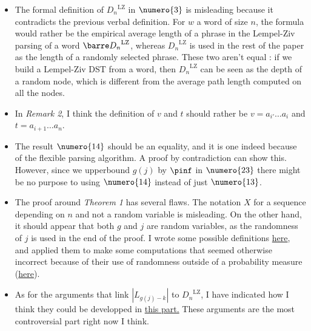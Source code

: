 
\begin{itemize}

\item The formal definition of ${D_n}^{\text{LZ}}$ in $\numero{3}$ is 
      misleading because it contradicts the previous verbal definition.
      For $w$ a word of size $n$, the formula
      would rather be the empirical average length of a phrase in the Lempel-Ziv
      parsing of a word ${\barre D_n}^{\text{LZ}}$, whereas
      ${D_n}^{\text{LZ}}$ is used in the rest of the paper as the length
      of a randomly selected phrase. These two aren't equal :
      if we build a Lempel-Ziv DST from a word, then 
      ${D_n}^{\text{LZ}}$ can be seen as the depth of a random node, 
      which is different from the average path length computed 
      on all the nodes. 

\item In \emph{Remark 2}, I think the definition of $v$ and 
      $t$ should rather be 
      $ v = a_{i'} \dots a_{i} $ and
      $ t = a_{i+1} \dots a_n$. 

\item The result $\numero{14}$ should be an equality, and it is one indeed
      because of the flexible parsing algorithm. A proof by contradiction
      can show this. However, since we upperbound $g(j)$ by $\pinf$ in 
      $\numero{23}$ there might be no purpose to using $\numero{14}$ 
      instead of just $\numero{13}$. 

\item The proof around \emph{Theorem 1} has several flaws.
      The notation $X$ for a sequence depending on $n$ and not a 
      random variable is misleading. On the other hand, it should appear
      that both $g$ and $j$ are random variables, as the randomness of 
      $j$ is used in the end of the proof.
      I wrote some possible definitions \hyperlink{definitions}{here},
      and applied them to make some computations that seemed otherwise
      incorrect because of their use of randomness outside of a probability
      measure (\hyperlink{computations}{here}).

\item As for the arguments that 
      link $|L_{g(j)-k}|$ to ${D_n}^{\text{LZ}}$, I have
      indicated how I think they could be developped in 
      \hyperlink{critics}{this part.} These arguments
      are the most controversial part right now I think.


\end{itemize}
